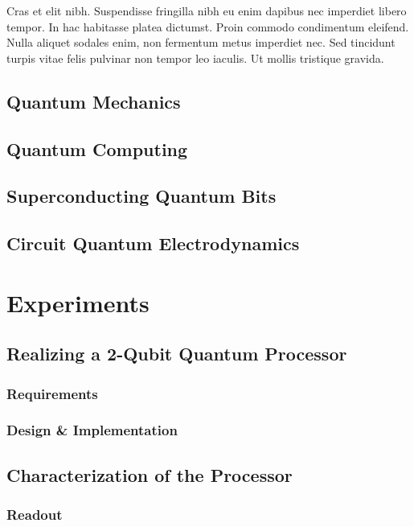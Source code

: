 \documentclass{scrbook}
\begin{document}
Cras et elit nibh. Suspendisse fringilla nibh eu enim dapibus nec imperdiet libero tempor. In hac habitasse platea dictumst. Proin commodo condimentum eleifend. Nulla aliquet sodales enim, non fermentum metus imperdiet nec. Sed tincidunt turpis vitae felis pulvinar non tempor leo iaculis. Ut mollis tristique gravida. 

\section{Quantum Mechanics}

\section{Quantum Computing}

\section{Superconducting Quantum Bits}

\section{Circuit Quantum Electrodynamics}

\chapter{Experiments}

\section{Realizing a 2-Qubit Quantum Processor}

\subsection{Requirements}

\subsection{Design \& Implementation}

\section{Characterization of the Processor}

\subsection{Readout}
\end{document}
